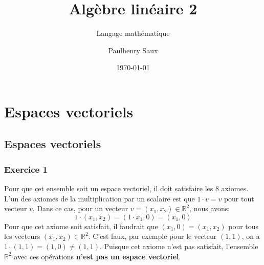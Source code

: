 \documentclass[french]{yLectureNote}
\title{Algèbre linéaire 2}
\subtitle{Langage mathématique}
\author{Paulhenry Saux}
\date{\today}
\begin{document}
\chapter{Espaces vectoriels}
\section{Espaces vectoriels}

\subsection{Exercice 1}
Pour que cet ensemble soit un espace vectoriel, il doit satisfaire les 8 axiomes. L'un des axiomes de la multiplication par un scalaire est que $1 \cdot v = v$ pour tout vecteur $v$.
Dans ce cas, pour un vecteur $v=(x_1, x_2) \in \mathbb{R}^2$, nous avons:
$$1 \cdot (x_1, x_2) = (1 \cdot x_1, 0) = (x_1, 0)$$
Pour que cet axiome soit satisfait, il faudrait que $(x_1, 0) = (x_1, x_2)$ pour tous les vecteurs $(x_1, x_2) \in \mathbb{R}^2$. C'est faux, par exemple pour le vecteur $(1,1)$, on a $1\cdot(1,1) = (1,0) \ne (1,1)$.
Puisque cet axiome n'est pas satisfait, l'ensemble $\mathbb{R}^{2}$ avec ces opérations \textbf{n'est pas un espace vectoriel}.
\end{document}
